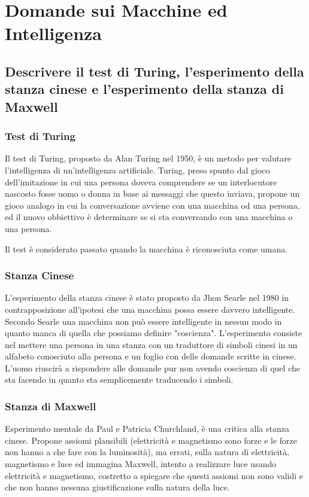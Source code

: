 \documentclass[\main/main.tex]{subfiles}
\begin{document}
\section{Domande sui Macchine ed Intelligenza}
\subsection{Descrivere il test di Turing, l'esperimento della stanza cinese e l'esperimento della stanza di Maxwell}
\subsubsection{Test di Turing}
Il test di Turing, proposto da Alan Turing nel 1950, è un metodo per valutare l'intelligenza di un'intelligenza artificiale. Turing, preso spunto dal gioco dell'imitazione in cui una persona doveva comprendere se un interlocutore nascosto fosse uomo o donna in base ai messaggi che questo inviava, propone un gioco analogo in cui la conversazione avviene con una macchina od una persona, ed il nuovo obbiettivo è determinare se si sta conversando con una macchina o una persona.

Il test è considerato passato quando la macchina è riconosciuta come umana.

\subsubsection{Stanza Cinese}
L'esperimento della stanza cinese è stato proposto da Jhon Searle nel 1980 in contrapposizione all'ipotesi che una macchina possa essere davvero intelligente. Secondo Searle una macchina non può essere intelligente in nessun modo in quanto manca di quella che possiamo definire "coscienza". L'esperimento consiste nel mettere una persona in una stanza con un traduttore di simboli cinesi in un alfabeto conosciuto alla persona e un foglio con delle domande scritte in cinese. L'uomo riuscirà a rispondere alle domande pur non avendo coscienza di quel che sta facendo in quanto sta semplicemente traducendo i simboli.

\subsubsection{Stanza di Maxwell}
Esperimento mentale da Paul e Patricia Churchland, è una critica alla stanza cinese. Propone assiomi plausibili (elettricità e magnetismo sono forze e le forze non hanno a che fare con la luminosità), ma errati, sulla natura di elettricità, magnetismo e luce ed immagina Maxwell, intento a realizzare luce usando elettricità e magnetismo, costretto a spiegare che questi assiomi non sono validi e che non hanno nessuna giustificazione sulla natura della luce.
\end{document}
